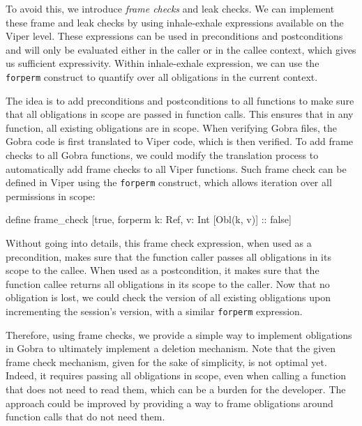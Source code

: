 To avoid this, we introduce \emph{frame checks} and leak checks.
We can implement these frame and leak checks by using inhale-exhale expressions available on the Viper level.
These expressions can be used in preconditions and postconditions and will only be evaluated either in the caller or in the callee context, which gives us sufficient expressivity.
Within inhale-exhale expression, we can use the \texttt{forperm} construct to quantify over all obligations in the current context.

The idea is to add preconditions and postconditions to all functions to make sure that all obligations in scope are passed in function calls. This ensures that in any function, all existing obligations are in scope.
When verifying Gobra files, the Gobra code is first translated to Viper code, which is then verified.
To add frame checks to all Gobra functions, we could modify the translation process to automatically add frame checks to all Viper functions.
Such frame check can be defined in Viper using the \texttt{forperm} construct, which allows iteration over all permissions in scope:
\begin{gobra}
define frame_check [true, forperm k: Ref, v: Int [Obl(k, v)] :: false]
\end{gobra}
Without going into details, this frame check expression, when used as a precondition, makes sure that the function caller passes all obligations in its scope to the callee. When used as a postcondition, it makes sure that the function callee returns all obligations in its scope to the caller.
Now that no obligation is lost, we could check the version of all existing obligations upon incrementing the session's version, with a similar \texttt{forperm} expression.

Therefore, using frame checks, we provide a simple way to implement obligations in Gobra to ultimately implement a deletion mechanism.
Note that the given frame check mechanism, given for the sake of simplicity, is not optimal yet. Indeed, it requires passing all obligations in scope, even when calling a function that does not need to read them, which can be a burden for the developer. The approach could be improved by providing a way to frame obligations around function calls that do not need them.